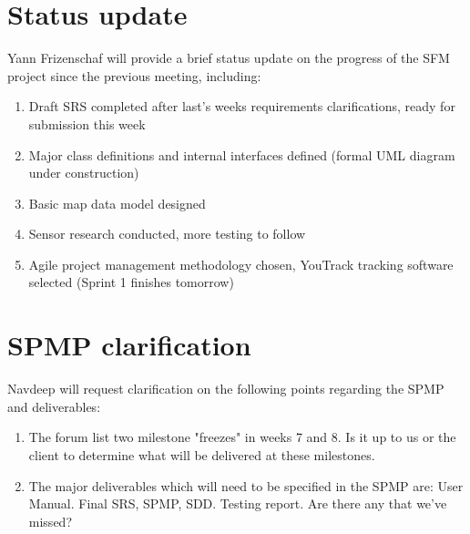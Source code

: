 \documentclass[11pt, a4paper]{article}
\begin{document}


\section{Status update}

Yann Frizenschaf will provide a brief status update on the progress of the SFM project since the previous meeting, including:

\begin{enumerate}

\item Draft SRS completed after last's weeks requirements clarifications, ready for submission this week

\item Major class definitions and internal interfaces defined (formal UML diagram under construction)

\item Basic map data model designed

\item Sensor research conducted, more testing to follow

\item Agile project management methodology chosen, YouTrack tracking software selected (Sprint 1 finishes tomorrow)

\end{enumerate}

\section{SPMP clarification}

Navdeep will request clarification on the following points regarding the SPMP and deliverables:

\begin{enumerate}

\item The forum list two milestone "freezes" in weeks 7 and 8. Is it up to us or the client to determine what will be delivered at these milestones.

\item The major deliverables which will need to be specified in the SPMP are: User Manual. Final SRS, SPMP, SDD. Testing report. Are there any that we've missed?

\end{enumerate}
\end{document}

